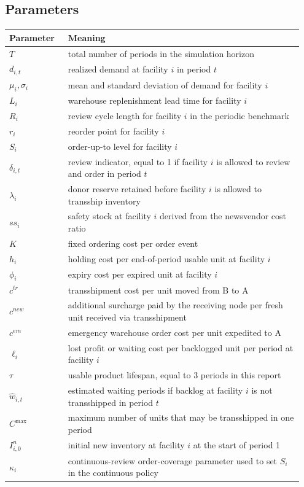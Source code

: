 \documentclass[11pt]{article}
\begin{document}
\subsection{Parameters}
\begin{longtable}{>{\raggedright\arraybackslash}p{0.19\linewidth} p{0.76\linewidth}}
\toprule
Parameter & Meaning \\
\midrule
$T$ & total number of periods in the simulation horizon \\
$d_{i,t}$ & realized demand at facility $i$ in period $t$ \\
$\mu_i, \sigma_i$ & mean and standard deviation of demand for facility $i$ \\
$L_i$ & warehouse replenishment lead time for facility $i$ \\
$R_i$ & review cycle length for facility $i$ in the periodic benchmark \\
$r_i$ & reorder point for facility $i$ \\
$S_i$ & order-up-to level for facility $i$ \\
$\delta_{i,t}$ & review indicator, equal to 1 if facility $i$ is allowed to review and order in period $t$ \\
$\lambda_i$ & donor reserve retained before facility $i$ is allowed to transship inventory \\
$ss_i$ & safety stock at facility $i$ derived from the newsvendor cost ratio \\
$K$ & fixed ordering cost per order event \\
$h_i$ & holding cost per end-of-period usable unit at facility $i$ \\
$\phi_i$ & expiry cost per expired unit at facility $i$ \\
$c^{tr}$ & transshipment cost per unit moved from B to A \\
$c^{new}$ & additional surcharge paid by the receiving node per fresh unit received via transshipment \\
$c^{em}$ & emergency warehouse order cost per unit expedited to A \\
$\ell_i$ & lost profit or waiting cost per backlogged unit per period at facility $i$ \\
$\tau$ & usable product lifespan, equal to 3 periods in this report \\
$\hat{w}_{i,t}$ & estimated waiting periods if backlog at facility $i$ is not transshipped in period $t$ \\
$C^{\max}$ & maximum number of units that may be transshipped in one period \\
$I^{n}_{i,0}$ & initial new inventory at facility $i$ at the start of period 1 \\
$\kappa_i$ & continuous-review order-coverage parameter used to set $S_i$ in the continuous policy \\
\bottomrule
\end{longtable}
\end{document}
